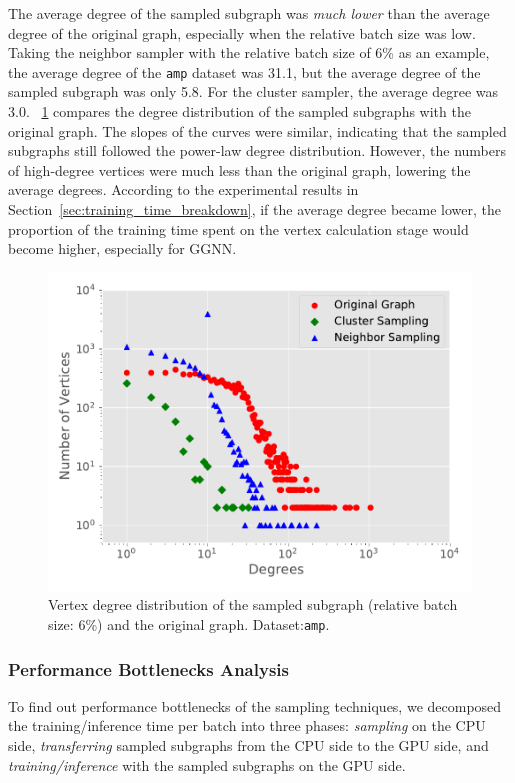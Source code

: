 The average degree of the sampled subgraph was \emph{much lower} than the average degree of the original graph, especially when the relative batch size was low.
%
Taking the neighbor sampler with the relative batch size of 6\% as an example, the average degree of the \texttt{amp} dataset was 31.1, but the average degree of the sampled subgraph was only 5.8.
%
For the cluster sampler, the average degree was 3.0.
%
\figurename~\ref{fig:exp_sampling_minibatch_degrees_distribution} compares the degree distribution of the sampled subgraphs with the original graph.
%
The slopes of the curves were similar, indicating that the sampled subgraphs still followed the power-law degree distribution.
%
However, the numbers of high-degree vertices were much less than the original graph, lowering the average degrees.
%
According to the experimental results in Section~\ref{sec:training_time_breakdown}, if the average degree became lower, the proportion of the training time spent on the vertex calculation stage would become higher, especially for GGNN.

\begin{figure}[H]
    \centering
    \includegraphics[width=0.4\columnwidth]{figs/experiments/exp_sampling_minibatch_degrees_distribution_amazon-photo.pdf}
    \caption{Vertex degree distribution of the sampled subgraph (relative batch size: 6\%) and the original graph. Dataset:\texttt{amp}.}
    \label{fig:exp_sampling_minibatch_degrees_distribution}
\end{figure}

\subsubsection{Performance Bottlenecks Analysis}

To find out performance bottlenecks of the sampling techniques, we decomposed the training/inference time per batch into three phases: \emph{sampling} on the CPU side, \emph{transferring} sampled subgraphs from the CPU side to the GPU side, and \emph{training/inference} with the sampled subgraphs on the GPU side.

